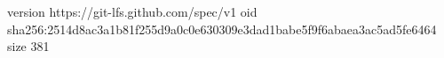 version https://git-lfs.github.com/spec/v1
oid sha256:2514d8ac3a1b81f255d9a0c0e630309e3dad1babe5f9f6abaea3ac5ad5fe6464
size 381
